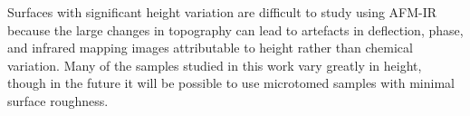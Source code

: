 Surfaces with significant height variation are difficult to study using AFM-IR because the large changes in topography can lead to artefacts in deflection, phase, and infrared mapping images attributable to height rather than chemical variation. Many of the samples studied in this work vary greatly in height, though in the future it will be possible to use microtomed samples with minimal surface roughness. 




 



